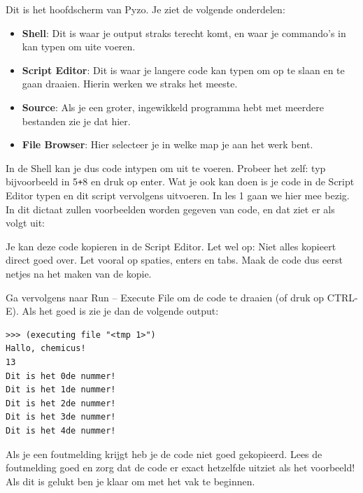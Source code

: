 Dit is het hoofdscherm van Pyzo. Je ziet de volgende onderdelen:
\begin{itemize}
\item \textbf{Shell}: Dit is waar je output straks terecht komt, en waar je commando's in kan typen om uite voeren.
\item \textbf{Script Editor}: Dit is waar je langere code kan typen om op te slaan en te gaan draaien. Hierin werken we straks het meeste.
\item \textbf{Source}: Als je een groter, ingewikkeld programma hebt met meerdere bestanden zie je dat hier.
\item \textbf{File Browser}: Hier selecteer je in welke map je aan het werk bent.
\end{itemize}

In de Shell kan je dus code intypen om uit te voeren. Probeer het zelf: typ bijvoorbeeld in 5\texttt{+}8 en druk op enter. Wat je ook kan doen is je code in de Script Editor typen en dit script vervolgens uitvoeren. In les 1 gaan we hier mee bezig. In dit dictaat zullen voorbeelden worden gegeven van code, en dat ziet er als volgt uit:



Je kan deze code kopieren in de Script Editor. Let wel op: Niet alles kopieert direct goed over. Let vooral op spaties, enters en tabs. Maak de code dus eerst netjes na het maken van de kopie.

Ga vervolgens naar Run -- Execute File om de code te draaien (of druk op CTRL-E). Als het goed is zie je dan de volgende output:
\begin{Verbatim}[frame=single]
>>> (executing file "<tmp 1>")
Hallo, chemicus!
13
Dit is het 0de nummer!
Dit is het 1de nummer!
Dit is het 2de nummer!
Dit is het 3de nummer!
Dit is het 4de nummer!
\end{Verbatim}

Als je een foutmelding krijgt heb je de code niet goed gekopieerd. Lees de foutmelding goed en zorg dat de code er exact hetzelfde uitziet als het voorbeeld! Als dit is gelukt ben je klaar om met het vak te beginnen.